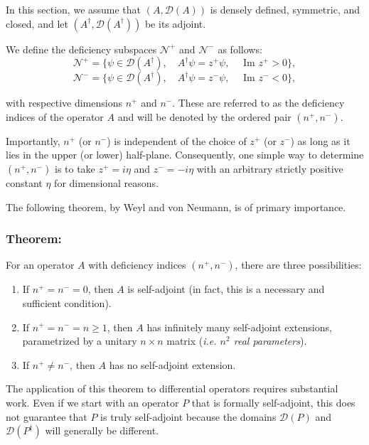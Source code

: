In this section, we assume that $(A, \mathcal{D}(A))$ is densely defined,
symmetric, and closed, and let $(A^\dagger, \mathcal{D}(A^\dagger))$ be its
adjoint.

We define the deficiency subspaces $\mathcal{N}^+$ and $\mathcal{N}^-$ as
follows:
\[
    \mathcal{N}^+ = \{\psi \in \mathcal{D}(A^\dagger), \quad A^\dagger\psi = z^+\psi, \quad \text{ Im } z^+ > 0\},
\]
\[
    \mathcal{N}^- = \{\psi \in \mathcal{D}(A^\dagger), \quad A^\dagger\psi = z^-\psi, \quad \text{ Im } z^- < 0\},
\]

with respective dimensions $n^+$ and $n^-$. These are referred to as the
deficiency indices of the operator $A$ and will be denoted by the ordered pair
$(n^+, n^-)$.

Importantly, $n^+$ (or $n^-$) is independent of the choice of $z^+$ (or $z^-$)
as long as it lies in the upper (or lower) half-plane. Consequently, one simple
way to determine $(n^+, n^-)$ is to take $z^+ = i\eta$ and $z^- = -i\eta$
with an arbitrary strictly positive constant $\eta$ for dimensional reasons.

\vspace{4mm}
\noindent
The following theorem, by Weyl and von Neumann, is of primary importance.

\subsubsection*{Theorem:}

For an operator $A$ with deficiency indices $(n^+, n^-)$, there are three possibilities:
\begin{enumerate}
    \item If $n^+ = n^- = 0$, then $A$ is self-adjoint (in fact, this is a necessary and
          sufficient condition).
    \item If $n^+ = n^- = n \geq 1$, then $A$ has infinitely many self-adjoint
          extensions, parametrized by a unitary $n \times n$ matrix (\textit{i.e. $n^2$ real parameters}).
    \item If $n^+ \neq n^-$, then $A$ has no self-adjoint extension.
\end{enumerate}

\noindent
The application of this theorem to differential operators requires substantial
work. Even if we start with an operator $P$ that is formally self-adjoint, this
does not guarantee that $P$ is truly self-adjoint because the domains
$\mathcal{D}(P)$ and $\mathcal{D}(P^\dagger)$ will generally be different.


